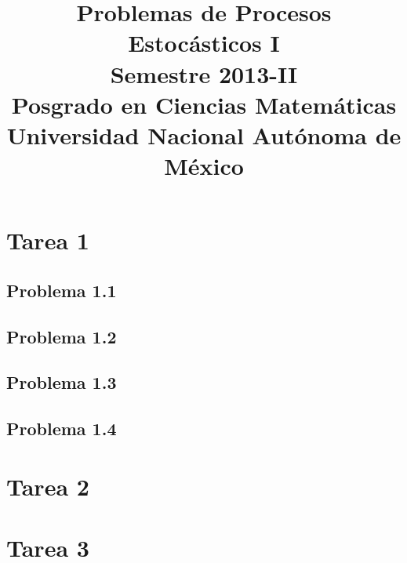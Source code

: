 \documentclass[a5paper,oneside]{amsart}
\title[Problemas de Procesos I]{Problemas de Procesos Estocásticos I\\ Semestre 2013-II\\ Posgrado en Ciencias Matemáticas\\ Universidad Nacional Autónoma de México}
\theoremstyle{dotless}
\begin{document}
	\maketitle
	\section{Tarea 1}
	\nqed
		\subsection{Problema 1.1}
		
		
		\subsection{Problema 1.2}
		
		
		\subsection{Problema 1.3}
		
		
		\subsection{Problema 1.4}
		
		\nqed
		
	\section{Tarea 2}

		
		\nqed
		
	\section{Tarea 3}

		

		
	
	
\end{document}
